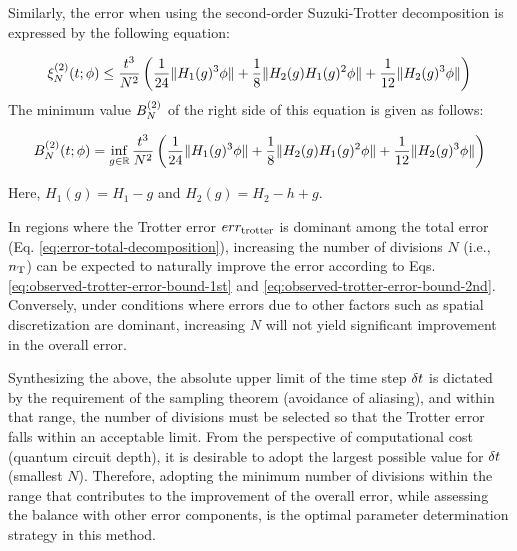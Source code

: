 \documentclass[report_2025.tex]{subfiles}
\begin{document}
Similarly, the error when using the second-order Suzuki-Trotter decomposition is
expressed by the following equation:

\begin{equation}
  \xi_{N}^{(2)}(t;\phi)\leq\frac{t^3}{N^2}\left(\frac{1}{24}\|H_1(g)^3\phi\| + \frac{1}{8}\|H_2(g)H_1(g)^2\phi\|
  +\frac{1}{12}\|H_2(g)^3\phi\|\right)
    \label{eq:observed-trotter-error-2nd}
\end{equation}
The minimum value $B_{N}^{(2)}$ of the right side of this equation is given as follows:

\begin{equation}
B_{N}^{(2)}(t;\phi)=\inf_{g\in\mathbb{R}}\frac{t^3}{N^2}
    \left(\frac{1}{24}\|H_1(g)^3\phi\| + \frac{1}{8}\|H_2(g)H_1(g)^2\phi\|
  +\frac{1}{12}\|H_2(g)^3\phi\|\right)
\label{eq:observed-trotter-error-bound-2nd}
\end{equation}

Here, $H_1(g) = H_1-g$ and $H_2(g) = H_2-h+g$.

In regions where the Trotter error $err_{\mathrm{trotter}}$ is dominant among the total
error (Eq. \eqref{eq:error-total-decomposition}), increasing the number of
divisions $N$ (i.e., $n_{\mathrm{T}}$) can be expected to naturally improve the error
according to Eqs. \eqref{eq:observed-trotter-error-bound-1st} and
\eqref{eq:observed-trotter-error-bound-2nd}. Conversely, under conditions where
errors due to other factors such as spatial discretization are dominant,
increasing $N$ will not yield significant improvement in the overall error.

Synthesizing the above, the absolute upper limit of the time step $\delta t$ is
dictated by the requirement of the sampling theorem (avoidance of aliasing), and
within that range, the number of divisions must be selected so that the Trotter
error falls within an acceptable limit. From the perspective of computational
cost (quantum circuit depth), it is desirable to adopt the largest possible
value for $\delta t$ (smallest $N$). Therefore, adopting the minimum number of
divisions within the range that contributes to the improvement of the overall
error, while assessing the balance with other error components, is the optimal
parameter determination strategy in this method.
\end{document}
